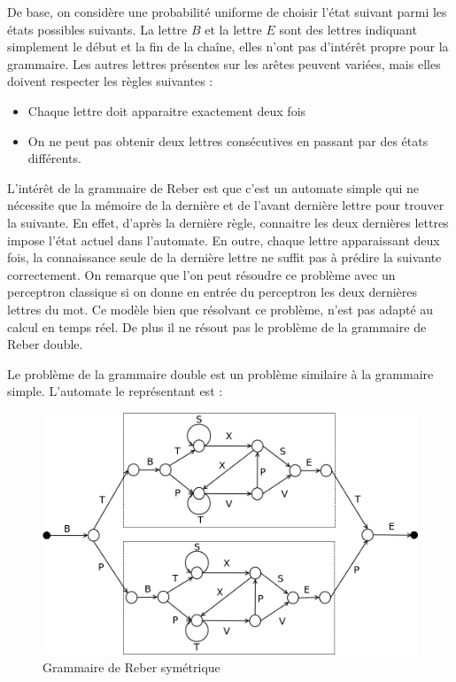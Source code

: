 De base, on considère une probabilité uniforme de choisir l'état suivant parmi les états possibles suivants.
La lettre $B$ et la lettre $E$ sont des lettres indiquant simplement le début et la fin de la chaîne, elles n'ont pas d'intérêt propre pour la grammaire.
Les autres lettres présentes sur les arêtes peuvent variées, mais elles doivent respecter les règles suivantes :
\medskip
\begin{itemize}
	\item Chaque lettre doit apparaitre exactement deux fois
	\item On ne peut pas obtenir deux lettres consécutives en passant par des états différents.
\end{itemize}
\vspace{\parskip}
L'intérêt de la grammaire de Reber est que c'est un automate simple qui ne nécessite que la mémoire de la dernière et de l'avant dernière lettre pour trouver la suivante.
En effet, d'après la dernière règle, connaitre les deux dernières lettres impose l'état actuel dans l'automate.
En outre, chaque lettre apparaissant deux fois, la connaissance seule de la dernière lettre ne suffit pas à prédire la suivante correctement.
On remarque que l'on peut résoudre ce problème avec un perceptron classique si on donne en entrée du perceptron les deux dernières lettres du mot.
Ce modèle bien que résolvant ce problème, n'est pas adapté au calcul en temps réel.
De plus il ne résout pas le problème de la grammaire de Reber double.

Le problème de la grammaire double est un problème similaire à la grammaire
simple. L'automate le représentant est :

\begin{figure}[!ht]
\begin{center}
\includegraphics[scale=0.4]{images/reberGrammarSymmetric.png}
\end{center}
\caption{Grammaire de Reber symétrique}
\end{figure}

